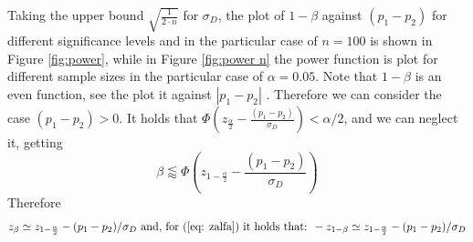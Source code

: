 \documentclass[14pt]{article}
\begin{document}
Taking the upper bound $\sqrt{\frac{1}{2\cdot n}}$ for $\sigma_{D}$, the plot of $1-\beta$ against $(p_{1}- p_{2})$ for different significance levels and in the particular case of $n=100$ is shown in Figure \ref{fig:power}, while in Figure \ref{fig:power n} the power function is plot for different sample sizes in the particular case of $\alpha=0.05$.
\newline
Note that  $1-\beta$ is an even function, see the plot it against $\left  |p_{1}- p_{2} \right |$ . Therefore we can consider the case $( p_{1}- p_{2} ) >0 $. It holds that $\Phi\left ( z_{\frac{\alpha}{2}}-\frac{(p_{1}- p_{2})}{\sigma_{D}} \right )< \alpha/2$, and we can neglect it, getting
\begin{equation}
\beta \lessapprox \Phi \left (z_{1-\frac{\alpha}{2}}- \frac{(p_{1}- p_{2})}{\sigma_{D}} \right )
\end{equation}
Therefore
\begin{equation}
z_{\beta}\simeq z_{1-\frac{\alpha}{2}} - (p_{1}- p_{2})/\sigma_{D} \text{ and, for (\ref{eq: zalfa})  it holds that: } -z_{1-\beta} \simeq z_{1-\frac{\alpha}{2}}- (p_{1}- p_{2})/\sigma_{D}
\end{equation}\newline
\end{document}
